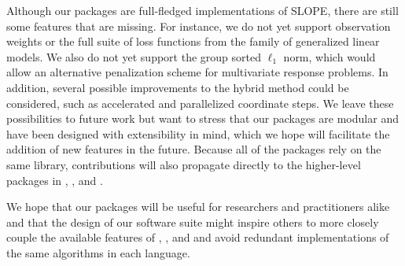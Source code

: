 \documentclass[article]{jss}
\begin{document}
Although our packages are full-fledged implementations of SLOPE, there are
still some features that are missing. For instance, we do not yet support
observation weights or the full suite of loss functions from the family of
generalized linear models. We also do not yet support the group sorted \(\ell_1\)
norm, which would allow an alternative penalization scheme for multivariate
response problems. In addition, several possible improvements to the hybrid
method could be considered, such as accelerated and parallelized coordinate
steps. We leave these possibilities to future work but want to stress that our
packages are modular and have been designed with extensibility in mind, which
we hope will facilitate the addition of new features in the future. Because all
of the packages rely on the same  library, contributions will
also propagate directly to the higher-level packages in ,
, and .

We hope that our packages will be useful for researchers and practitioners
alike and that the design of our software suite might inspire others to more
closely couple the available features of , , and
 and avoid redundant implementations of the same algorithms in
each language.



\newpage
\end{document}
